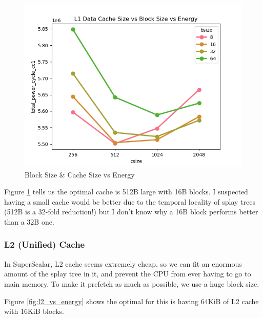 \documentclass{article}
\newcommand{\optimisation}[1]{
  
}
\begin{document}
\begin{multicols}{2}
  \begin{figure}[H]
    \centering
    \includegraphics[width=\linewidth]{./assets/l1_vs_energy.png}
    \caption{Block Size \& Cache Size vs Energy}
    \label{fig:l1_vs_energy}
  \end{figure}

  Figure \ref{fig:l1_vs_energy} tells us the optimal cache is 512B large with 16B blocks. I suspected having a small cache would be better due to the temporal locality of splay trees (512B is a 32-fold reduction!) but I don't know why a 16B block performs better than a 32B one.

  \optimisation{dl1_cache}

  \subsubsection{L2 (Unified) Cache}
  In SuperScalar, L2 cache seems extremely cheap, so we can fit an enormous amount of the splay tree in it, and prevent the CPU from ever having to go to main memory. To make it prefetch as much as possible, we use a huge block size.

  Figure \ref{fig:l2_vs_energy} shows the optimal for this is having 64KiB of L2 cache with 16KiB blocks.


\end{multicols}
\end{document}
